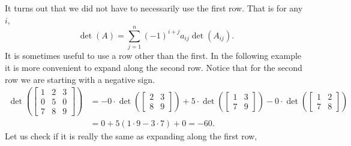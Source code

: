 \documentclass{ximera}
\begin{document}
It turns out that we did not have to necessarily use the first row.  That is for any $i$,
\begin{equation*}
\det (A) = \sum_{j=1}^n {(-1)}^{i+j} a_{ij} \det (A_{ij}) .
\end{equation*}
It is sometimes useful to use a row other than the first.  In the following example it is more convenient to expand along the second row.  Notice that for the second row we are starting with a negative sign.
\begin{equation*}
    \begin{split}
        \det 
        \left(
            \begin{bmatrix}
                1 & 2 & 3 \\
                0 & 5 & 0 \\
                7 & 8 & 9
            \end{bmatrix}
        \right)
        & = - 0 \cdot \det 
        \left(
            \begin{bmatrix}
                2 & 3 \\
                8 & 9
            \end{bmatrix}
        \right)
        + 5 \cdot
        \det 
        \left(
            \begin{bmatrix}
                1 & 3 \\
                7 & 9
            \end{bmatrix}
        \right)
        - 0 \cdot
        \det 
        \left(
            \begin{bmatrix}
                1 & 2 \\
                7 & 8
            \end{bmatrix}
        \right) \\
        & = 0 + 5 (1 \cdot 9 - 3 \cdot 7) + 0 = -60 .
    \end{split}
\end{equation*}
Let us check if it is really the same as expanding along the first row,
\end{document}
